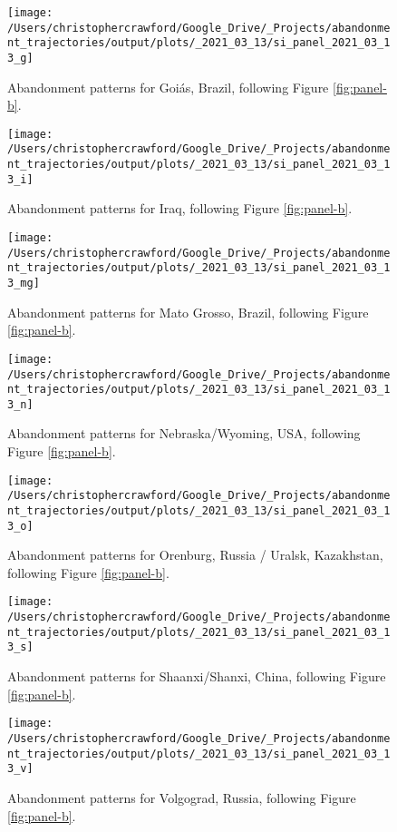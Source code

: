\documentclass[9pt,twocolumn,twoside,lineno]{pnas-new}
\begin{document}
\begin{figure}
\texttt{[image: /Users/christophercrawford/Google\_Drive/\_Projects/abandonment\_trajectories/output/plots/\_2021\_03\_13/si\_panel\_2021\_03\_13\_g]} \caption{Abandonment patterns for Goiás, Brazil, following Figure \ref{fig:panel-b}.}\label{fig:panel-g}
\end{figure}

\begin{figure}
\texttt{[image: /Users/christophercrawford/Google\_Drive/\_Projects/abandonment\_trajectories/output/plots/\_2021\_03\_13/si\_panel\_2021\_03\_13\_i]} \caption{Abandonment patterns for Iraq, following Figure \ref{fig:panel-b}.}\label{fig:panel-i}
\end{figure}

\begin{figure}
\texttt{[image: /Users/christophercrawford/Google\_Drive/\_Projects/abandonment\_trajectories/output/plots/\_2021\_03\_13/si\_panel\_2021\_03\_13\_mg]} \caption{Abandonment patterns for Mato Grosso, Brazil, following Figure \ref{fig:panel-b}.}\label{fig:panel-mg}
\end{figure}

\begin{figure}
\texttt{[image: /Users/christophercrawford/Google\_Drive/\_Projects/abandonment\_trajectories/output/plots/\_2021\_03\_13/si\_panel\_2021\_03\_13\_n]} \caption{Abandonment patterns for Nebraska/Wyoming, USA, following Figure \ref{fig:panel-b}.}\label{fig:panel-n}
\end{figure}

\begin{figure}
\texttt{[image: /Users/christophercrawford/Google\_Drive/\_Projects/abandonment\_trajectories/output/plots/\_2021\_03\_13/si\_panel\_2021\_03\_13\_o]} \caption{Abandonment patterns for Orenburg, Russia / Uralsk, Kazakhstan, following Figure \ref{fig:panel-b}.}\label{fig:panel-o}
\end{figure}

\begin{figure}
\texttt{[image: /Users/christophercrawford/Google\_Drive/\_Projects/abandonment\_trajectories/output/plots/\_2021\_03\_13/si\_panel\_2021\_03\_13\_s]} \caption{Abandonment patterns for Shaanxi/Shanxi, China, following Figure \ref{fig:panel-b}.}\label{fig:panel-s}
\end{figure}

\begin{figure}
\texttt{[image: /Users/christophercrawford/Google\_Drive/\_Projects/abandonment\_trajectories/output/plots/\_2021\_03\_13/si\_panel\_2021\_03\_13\_v]} \caption{Abandonment patterns for Volgograd, Russia, following Figure \ref{fig:panel-b}.}\label{fig:panel-v}
\end{figure}
\end{document}
